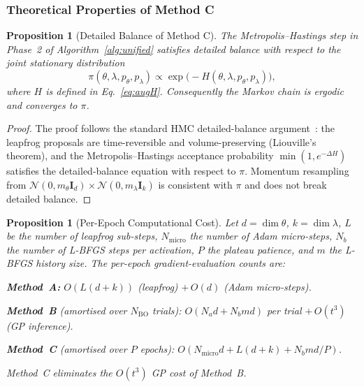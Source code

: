 \documentclass[11pt]{article}
\newtheorem{proposition}[theorem]{Proposition}
\theoremstyle{definition}
\begin{document}
\subsubsection{Theoretical Properties of Method C}

\begin{proposition}[Detailed Balance of Method C]
\label{prop:detailed_balance}
The Metropolis--Hastings step in Phase~2 of Algorithm~\ref{alg:unified}
satisfies detailed balance with respect to the joint stationary
distribution
\[
  \pi(\theta,\lambda,p_\theta,p_\lambda)
  \propto \exp\bigl(-H(\theta,\lambda,p_\theta,p_\lambda)\bigr),
\]
where $H$ is defined in Eq.~\eqref{eq:augH}. Consequently the Markov
chain is ergodic and converges to $\pi$.
\end{proposition}
\begin{proof}
The proof follows the standard HMC detailed-balance
argument~\cite[Sec.~5.2]{neal2011}: the leapfrog proposals are
time-reversible and volume-preserving (Liouville's theorem), and the
Metropolis--Hastings acceptance probability $\min(1,e^{-\Delta H})$
satisfies the detailed-balance equation with respect to $\pi$.
Momentum resampling from
$\mathcal{N}(0,m_\theta\mathbf{I}_d)\times\mathcal{N}(0,m_\lambda\mathbf{I}_k)$
is consistent with $\pi$ and does not break detailed balance.
\end{proof}

\begin{proposition}[Per-Epoch Computational Cost]
\label{prop:cost}
Let $d=\dim\theta$, $k=\dim\lambda$, $L$ be the number of leapfrog
sub-steps, $N_{\mathrm{micro}}$ the number of Adam micro-steps, $N_b$
the number of L-BFGS steps per activation, $P$ the plateau patience,
and $m$ the L-BFGS history size. The per-epoch gradient-evaluation
counts are:

\noindent\textbf{Method~A:} $O(L(d+k))$ (leapfrog)
$+\,O(d)$ (Adam micro-steps).

\noindent\textbf{Method~B} (amortised over $N_{\mathrm{BO}}$ trials):
$O(N_a d + N_b m d)$ per trial $+\,O(t^3)$ (GP inference).

\noindent\textbf{Method~C} (amortised over $P$ epochs):
$O(N_{\mathrm{micro}} d + L(d+k) + N_b m d/P)$.

Method~C eliminates the $O(t^3)$ GP cost of Method~B.
\end{proposition}

\end{document}
